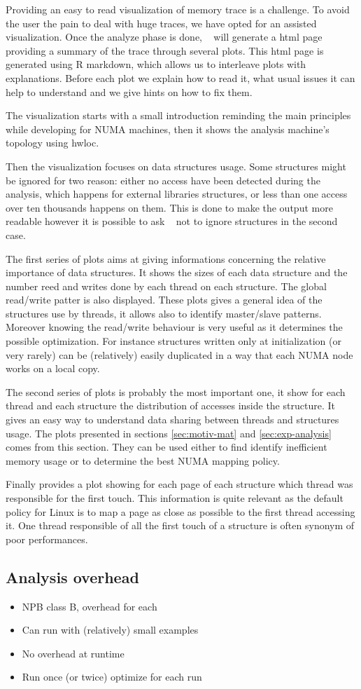 Providing an easy to read visualization of memory trace is a challenge. To
avoid the user the pain to deal with huge traces, we have opted for an
assisted visualization. Once the analyze phase is done, \TABARNAC~ will
generate a html page providing a summary of the trace through several plots.
This html page is generated using R markdown, which allows us to interleave
plots with explanations. Before each plot we explain how to read it, what
usual issues it can help to understand and we give hints on how to fix them.

The visualization starts with a small introduction reminding the main
principles while developing for NUMA machines, then it shows the analysis
machine's topology using hwloc\cite{Broquedis10hwloc}.

Then the visualization focuses on data structures usage. Some structures might
be ignored for two reason: either no access have been detected during the
analysis, which happens for external libraries structures, or less than one
access over ten thousands happens on them. This is done to make the output
more readable however it is possible to ask \TABARNAC~ not to ignore
structures in the second case.

The first series of plots aims at giving informations concerning the relative
importance of data structures. It shows the sizes of each data structure and the
number reed and writes done by each thread on each structure. The global
read/write patter is also displayed. These plots gives a general idea of the
structures use by threads, it allows also to identify master/slave patterns.
Moreover knowing the read/write behaviour is very useful as it determines the
possible optimization. For instance structures written only at initialization
(or very rarely) can be (relatively) easily duplicated in a way that each NUMA
node works on a local copy.

The second series of plots is probably the most important one, it show for
each thread and each structure the distribution of accesses inside the
structure. It gives an easy way to understand data sharing between threads and
structures usage. The plots presented in sections \ref{sec:motiv-mat} and
\ref{sec:exp-analysis} comes from this section. They can be used either to
find identify inefficient memory usage or to determine the best NUMA mapping
policy.

Finally \TABARNAC provides a plot showing for each page of each structure
which thread was responsible for the first touch. This information is quite
relevant as the default policy for Linux is to map a page as close as possible
to the first thread accessing it. One thread responsible of all the first
touch of a structure is often synonym of poor performances.

\subsection{Analysis overhead}
\label{sec:expe-overhead}
\begin{itemize}
    \item NPB class B, overhead for each
    \item Can run with (relatively) small  examples
    \item No overhead at runtime
    \item Run once (or twice) optimize for each run
\end{itemize}
